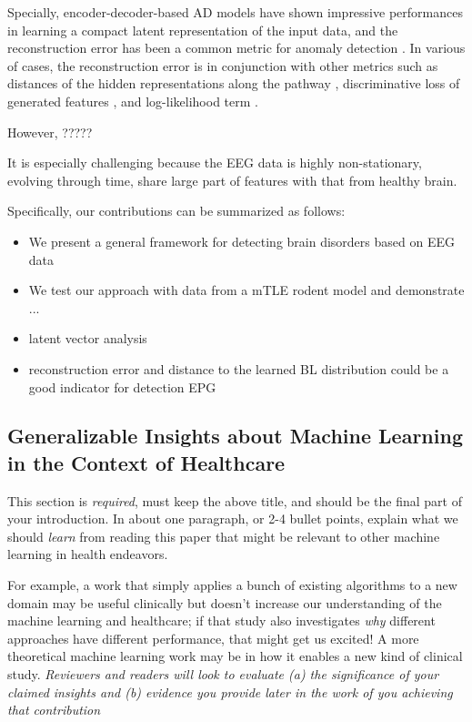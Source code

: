 \documentclass[pmlr]{jmlr}%
\begin{document}
Specially, encoder-decoder-based AD models have shown impressive performances in learning a compact latent representation of the input data, and the reconstruction error has been a common metric for anomaly detection \cite{zhou2019beatgan, kumagai2019transfer, malhotra2016lstm, abati2019latent, schlegl2017unsupervised, su2019robust, kim2019rap}. In various of cases, the reconstruction error is in conjunction with other metrics such as distances of the hidden representations along the pathway \cite{kim2019rapp}, discriminative loss of generated features \cite{schlegl2017unsupervised}, and log-likelihood term \cite{abati2019latent}. 

However, ?????

It is especially challenging because the EEG data is highly non-stationary, evolving through time, share large part of features with that from healthy brain. 





Specifically, our contributions can be summarized as follows:
\begin{itemize}
	\item We present a general framework for detecting brain disorders based on EEG data
	\item We test our approach with data from a mTLE rodent model and demonstrate ... 
	\item latent vector analysis 
	\item reconstruction error and distance to the learned BL distribution could be a good indicator for detection EPG
\end{itemize}


\subsection*{Generalizable Insights about Machine Learning in the Context of Healthcare}
This section is \emph{required}, must keep the above title, and should
be the final part of your introduction.  In about one paragraph, or
2-4 bullet points, explain what we should \emph{learn} from reading
this paper that might be relevant to other machine learning in health
endeavors.

For example, a work that simply applies a bunch of existing algorithms
to a new domain may be useful clinically but doesn't increase our
understanding of the machine learning and healthcare; if that study
also investigates \emph{why} different approaches have different
performance, that might get us excited!  A more theoretical machine
learning work may be in how it enables a new kind of clinical study.
\emph{Reviewers and readers will look to evaluate (a) the significance
	of your claimed insights and (b) evidence you provide later in the
	work of you achieving that contribution}
\end{document}
